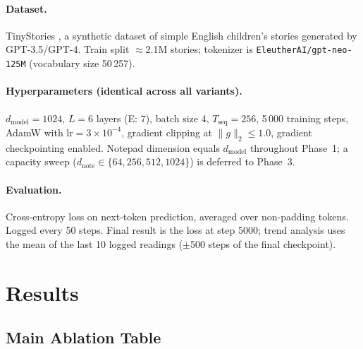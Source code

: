 \documentclass[11pt,a4paper]{article}
\begin{document}
\paragraph{Dataset.}
TinyStories \cite{eldan2023tinystories}, a synthetic dataset of simple
English children's stories generated by GPT-3.5/GPT-4.  Train split
$\approx$2.1M stories; tokenizer is \texttt{EleutherAI/gpt-neo-125M}
(vocabulary size 50\,257).

\paragraph{Hyperparameters (identical across all variants).}
$d_{\text{model}}{=}1024$, $L{=}6$ layers (E: 7), batch size 4,
$T_{\text{seq}}{=}256$, 5\,000 training steps, AdamW with
$\text{lr}{=}3\times10^{-4}$, gradient clipping at $\|g\|_2{\leq}1.0$,
gradient checkpointing enabled.  Notepad dimension equals $d_{\text{model}}$
throughout Phase~1; a capacity sweep ($d_\text{note}{\in}\{64,256,512,1024\}$)
is deferred to Phase~3.

\paragraph{Evaluation.}
Cross-entropy loss on next-token prediction, averaged over non-padding
tokens.  Logged every 50 steps.  Final result is the loss at step 5000;
trend analysis uses the mean of the last 10 logged readings
($\pm$500 steps of the final checkpoint).

\section{Results}
\label{sec:results}

\subsection{Main Ablation Table}
\end{document}
